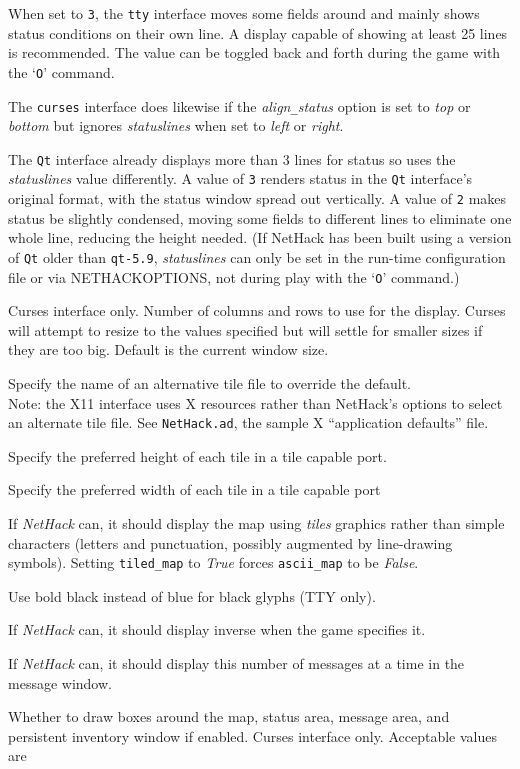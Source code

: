 When set to {\tt 3}, the {\tt tty} interface moves some fields around and
mainly shows status conditions on their own line.
A display capable of showing at least 25 lines is recommended.
The value can be toggled back and forth during the game with the `{\tt O}'
command.

The {\tt curses} interface does likewise if the
{\it align\verb+_+status\/}
option is set to {\it top\/} or {\it bottom\/} but ignores
{\it statuslines\/}
when set to {\it left\/} or {\it right}.

The {\tt Qt} interface already displays more than 3 lines for status
so uses the
{\it statuslines\/}
value differently.
A value of {\tt 3} renders status in the {\tt Qt} interface's
original format, with the status window spread out vertically.
A value of {\tt 2} makes status be slightly condensed, moving some
fields to different lines to eliminate one whole line, reducing the
height needed.
(If NetHack has been built using a version of {\tt Qt}
older than {\tt qt-5.9},
{\it statuslines\/}
can only be set in the run-time configuration file or via NETHACKOPTIONS,
not during play with the `{\tt O}' command.)
\item[\ib{term\verb+_+cols} {\normalfont and}]
\item[\ib{term\verb+_+rows}]
Curses interface only.
Number of columns and rows to use for the display.
Curses will attempt to resize to the values specified but will settle
for smaller sizes if they are too big.
Default is the current window size.
\item[\ib{tile\verb+_+file}]
Specify the name of an alternative tile file to override the default.
\\
Note: the X11 interface uses X resources rather than NetHack's options
to select an alternate tile file.
See {\tt NetHack.ad}, the sample X ``application defaults'' file.
\item[\ib{tile\verb+_+height}]
Specify the preferred height of each tile in a tile capable port.
\item[\ib{tile\verb+_+width}]
Specify the preferred width of each tile in a tile capable port
\item[\ib{tiled\verb+_+map}]
If {\it NetHack\/} can, it should display the map using {\it tiles} graphics
rather than simple characters (letters and punctuation, possibly
augmented by line-drawing symbols).
Setting {\tt tiled\verb+_+map} to {\it True\/} forces
{\tt ascii\verb+_+map} to be {\it False}.
\item[\ib{use\verb+_+darkgray}]
Use bold black instead of blue for black glyphs (TTY only).
\item[\ib{use\verb+_+inverse}]
If {\it NetHack\/} can, it should display inverse when the game specifies it.
\item[\ib{vary\verb+_+msgcount}]
If {\it NetHack\/} can, it should display this number of messages at a time
in the message window.
\item[\ib{windowborders}]
Whether to draw boxes around the map, status area, message area, and
persistent inventory window if enabled.
Curses interface only.
Acceptable values are

